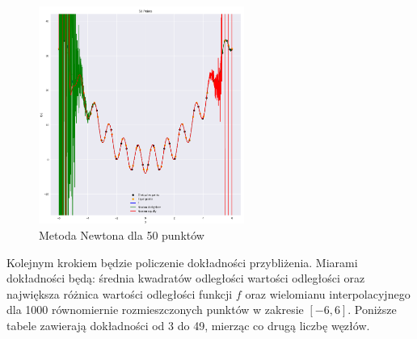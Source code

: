 \documentclass{article}
\begin{document}
\begin{figure}[H]
    \centering
    \includegraphics[width=0.6\textwidth]{img/newt_50.png}
    \caption{Metoda Newtona dla 50 punktów}
\end{figure}

Kolejnym krokiem będzie policzenie dokładności przybliżenia. Miarami dokładności będą: średnia kwadratów odległości wartości odległości oraz największa różnica wartości odległości 
funkcji $f$ oraz wielomianu interpolacyjnego dla 1000 równomiernie rozmieszczonych punktów w zakresie $[-6,6]$. Poniższe tabele
zawierają dokładności od 3 do 49, mierząc co drugą liczbę węzłów.
\end{document}

